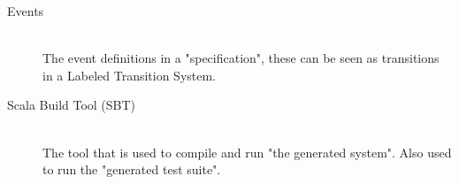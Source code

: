 \begin{description}
\item[Events]\hfill\\
The event definitions in a "specification", these can be seen as transitions in a Labeled Transition System.

\item[Scala Build Tool (SBT)]\hfill\\
The tool that is used to compile and run "the generated system". Also used to run the "generated test suite".


\end{description}
